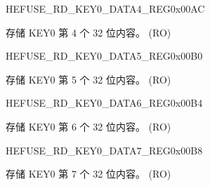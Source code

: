 \begin{register}{H}{EFUSE\_RD\_KEY0\_DATA4\_REG}{0x00AC}\label{regdesc:EFUSERDKEY0DATA4REG}
%
\regnewline%
\begin{regdesc}\begin{reglist}
\label{fielddesc:EFUSEKEY0DATA4}\item [EFUSE\_KEY0\_DATA4] 存储 KEY0 第 4 个 32 位内容。 (RO)
\end{reglist}\end{regdesc}
\end{register}


\begin{register}{H}{EFUSE\_RD\_KEY0\_DATA5\_REG}{0x00B0}\label{regdesc:EFUSERDKEY0DATA5REG}
%
\regnewline%
\begin{regdesc}\begin{reglist}
\label{fielddesc:EFUSEKEY0DATA5}\item [EFUSE\_KEY0\_DATA5] 存储 KEY0 第 5 个 32 位内容。 (RO)
\end{reglist}\end{regdesc}
\end{register}


\begin{register}{H}{EFUSE\_RD\_KEY0\_DATA6\_REG}{0x00B4}\label{regdesc:EFUSERDKEY0DATA6REG}
%
\regnewline%
\begin{regdesc}\begin{reglist}
\label{fielddesc:EFUSEKEY0DATA6}\item [EFUSE\_KEY0\_DATA6] 存储 KEY0 第 6 个 32 位内容。 (RO)
\end{reglist}\end{regdesc}
\end{register}


\begin{register}{H}{EFUSE\_RD\_KEY0\_DATA7\_REG}{0x00B8}\label{regdesc:EFUSERDKEY0DATA7REG}
%
\regnewline%
\begin{regdesc}\begin{reglist}
\label{fielddesc:EFUSEKEY0DATA7}\item [EFUSE\_KEY0\_DATA7] 存储 KEY0 第 7 个 32 位内容。 (RO)
\end{reglist}\end{regdesc}
\end{register}


